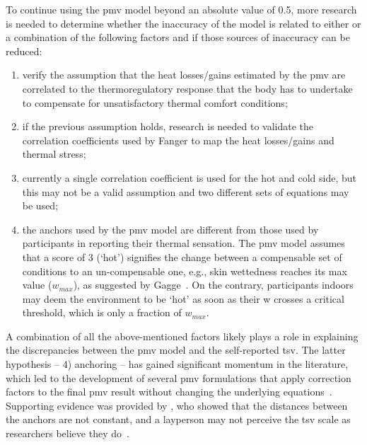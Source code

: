 To continue using the \ac{pmv} model beyond an absolute value of \num{0.5}, more research is needed to determine whether the inaccuracy of the model is related to either or a combination of the following factors and if those sources of inaccuracy can be reduced:
\begin{enumerate}
    \item verify the assumption that the heat losses/gains estimated by the \ac{pmv} are correlated to the thermoregulatory response that the body has to undertake to compensate for unsatisfactory thermal comfort conditions;
    \item if the previous assumption holds, research is needed to validate the correlation coefficients used by Fanger to map the heat losses/gains and thermal stress;
    \item currently a single correlation coefficient is used for the hot and cold side, but this may not be a valid assumption and two different sets of equations may be used;
    \item the anchors used by the \ac{pmv} model are different from those used by participants in reporting their thermal sensation.
    The \ac{pmv} model assumes that a score of 3 (`hot') signifies the change between a compensable set of conditions to an un-compensable one, e.g., skin wettedness reaches its max value ($w_{max}$), as suggested by Gagge~\cite{GaggeSET}.
    On the contrary, participants indoors may deem the environment to be `hot' as soon as their \ac{w} crosses a critical threshold, which is only a fraction of $w_{max}$.
\end{enumerate}

A combination of all the above-mentioned factors likely plays a role in explaining the discrepancies between the \ac{pmv} model and the self-reported \ac{tsv}.
The latter hypothesis -- 4) anchoring -- has gained significant momentum in the literature, which led to the development of several \ac{pmv} formulations that apply correction factors to the final \ac{pmv} result without changing the underlying equations~\cite{Yao2022, Toftum2002}.
Supporting evidence was provided by , who showed that the distances between the anchors are not constant, and a layperson may not perceive the \ac{tsv} scale as researchers believe they do~\cite{schweiker2019scales, schweiker2020evaluating}.

